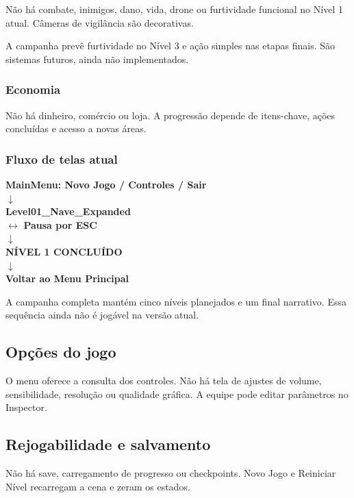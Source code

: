 \documentclass[12pt,a4paper]{article}
\begin{document}
Não há combate, inimigos, dano, vida, drone ou furtividade funcional
no Nível 1 atual. Câmeras de vigilância são decorativas.

A campanha prevê furtividade no Nível 3 e ação simples nas etapas
finais. São sistemas futuros, ainda não implementados.

\subsubsection{Economia}

Não há dinheiro, comércio ou loja. A progressão depende de itens-chave,
ações concluídas e acesso a novas áreas.

\subsubsection{Fluxo de telas atual}

\begin{center}
\textbf{MainMenu: Novo Jogo / Controles / Sair}\\[0.2cm]
$\downarrow$\\[0.2cm]
\textbf{Level01\_Nave\_Expanded}\\[0.2cm]
$\leftrightarrow$ \textbf{Pausa por ESC}\\[0.2cm]
$\downarrow$\\[0.2cm]
\textbf{NÍVEL 1 CONCLUÍDO}\\[0.2cm]
$\downarrow$\\[0.2cm]
\textbf{Voltar ao Menu Principal}
\end{center}

A campanha completa mantém cinco níveis planejados e um final
narrativo. Essa sequência ainda não é jogável na versão atual.

\subsection{Opções do jogo}

O menu oferece a consulta dos controles. Não há tela de ajustes de
volume, sensibilidade, resolução ou qualidade gráfica. A equipe
pode editar parâmetros no Inspector.

\subsection{Rejogabilidade e salvamento}

Não há save, carregamento de progresso ou checkpoints. Novo Jogo e
Reiniciar Nível recarregam a cena e zeram os estados.
\end{document}
